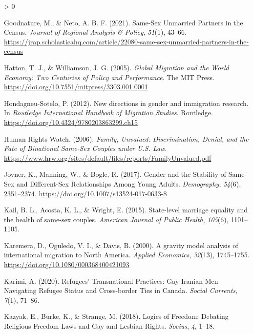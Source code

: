 \documentclass[
  11pt,
]{article}
\newlength{\cslhangindent}
\newenvironment{CSLReferences}[2] %
 {%
  \setlength{\parindent}{0pt}
  \ifodd #1 \everypar{\setlength{\hangindent}{\cslhangindent}}\ignorespaces\fi
  \ifnum #2 > 0
  \setlength{\parskip}{#2\baselineskip}
  \fi
 }%
 {}
\begin{document}
\begin{CSLReferences}{1}{0}
\leavevmode\hypertarget{ref-goodnature_2021}{}%
Goodnature, M., \& Neto, A. B. F. (2021). Same-{Sex} {Unmarried} {Partners} in the {Census}. \emph{Journal of Regional Analysis \& Policy}, \emph{51}(1), 43--66. \url{https://jrap.scholasticahq.com/article/22080-same-sex-unmarried-partners-in-the-census}

\leavevmode\hypertarget{ref-hatton_2005a}{}%
Hatton, T. J., \& Williamson, J. G. (2005). \emph{Global {Migration} and the {World} {Economy}: {Two} {Centuries} of {Policy} and {Performance}}. The MIT Press. \url{https://doi.org/10.7551/mitpress/3303.001.0001}

\leavevmode\hypertarget{ref-hondagneu-sotelo_2012}{}%
Hondagneu-Sotelo, P. (2012). New directions in gender and immigration research. In \emph{Routledge {International} {Handbook} of {Migration} {Studies}}. Routledge. \url{https://doi.org/10.4324/9780203863299.ch15}

\leavevmode\hypertarget{ref-humanrightswatch_2006}{}%
Human Rights Watch. (2006). \emph{Family, {Unvalued}: {Discrimination}, {Denial}, and the {Fate} of {Binational} {Same}-{Sex} {Couples} under {U}.{S}. {Law}}. \url{https://www.hrw.org/sites/default/files/reports/FamilyUnvalued.pdf}

\leavevmode\hypertarget{ref-joyner_2017}{}%
Joyner, K., Manning, W., \& Bogle, R. (2017). Gender and the {Stability} of {Same}-{Sex} and {Different}-{Sex} {Relationships} {Among} {Young} {Adults}. \emph{Demography}, \emph{54}(6), 2351--2374. \url{https://doi.org/10.1007/s13524-017-0633-8}

\leavevmode\hypertarget{ref-kail_2015}{}%
Kail, B. L., Acosta, K. L., \& Wright, E. (2015). State-level marriage equality and the health of same-sex couples. \emph{American Journal of Public Health}, \emph{105}(6), 1101--1105.

\leavevmode\hypertarget{ref-karemera_2000}{}%
Karemera, D., Oguledo, V. I., \& Davis, B. (2000). A gravity model analysis of international migration to {North} {America}. \emph{Applied Economics}, \emph{32}(13), 1745--1755. \url{https://doi.org/10.1080/000368400421093}

\leavevmode\hypertarget{ref-karimi_2020}{}%
Karimi, A. (2020). Refugees' {Transnational} {Practices}: {Gay} {Iranian} {Men} {Navigating} {Refugee} {Status} and {Cross}-border {Ties} in {Canada}. \emph{Social Currents}, \emph{7}(1), 71--86.

\leavevmode\hypertarget{ref-kazyak_2018}{}%
Kazyak, E., Burke, K., \& Strange, M. (2018). Logics of {Freedom}: {Debating} {Religious} {Freedom} {Laws} and {Gay} and {Lesbian} {Rights}. \emph{Socius}, \emph{4}, 1--18.


\end{CSLReferences}
\end{document}
